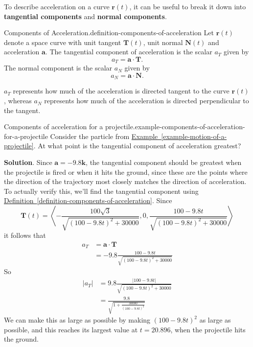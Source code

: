 \documentclass[10pt,]{book}
\newcommand{\terminology}[1]{\textbf{#1}}
\numberwithin{equation}{section}
\newcommand{\vv}[1]{\mathbf{#1}}
\newcommand{\dotprod}[1]{\left\langle #1 \right\rangle}
\begin{document}
\hypertarget{p-1317}{}%
To describe acceleration on a curve \(\vv{r}(t)\), it can be useful to break it down into \terminology{tangential components} and \terminology{normal components}.%
\begin{definition}{Components of Acceleration.}{definition-components-of-acceleration}%
\hypertarget{p-1318}{}%
Let \(\vv{r}(t)\) denote a space curve with unit tangent \(\vv{T}(t)\), unit normal \(\vv{N}(t)\) and acceleration \(\vv{a}\). The tangential component of acceleration is the scalar \(a_{T}\) given by%
%
\begin{equation*}
a_{T} = \vv{a}\cdot\vv{T}.
\end{equation*}
\hypertarget{p-1319}{}%
The normal component is the scalar \(a_{N}\) given by%
%
\begin{equation*}
a_{N} = \vv{a}\cdot\vv{N}.
\end{equation*}
\end{definition}
\hypertarget{p-1320}{}%
\(a_{T}\) represents how much of the acceleration is directed tangent to the curve \(\vv{r}(t)\), whereas \(a_{N}\) represents how much of the acceleration is directed perpendicular to the tangent.%
\begin{example}{Components of acceleration for a projectile.}{example-components-of-acceleration-for-a-projectile}%
\hypertarget{p-1321}{}%
Consider the particle from \hyperref[example-motion-of-a-projectile]{Example~\ref{example-motion-of-a-projectile}}. At what point is the tangential component of acceleration greatest?%
\par\smallskip%
\noindent\textbf{Solution}.\hypertarget{solution-210}{}\quad%
\hypertarget{p-1322}{}%
Since \(\vv{a} = -9.8\vv{k}\), the tangential component should be greatest when the projectile is fired or when it hits the ground, since these are the points where the direction of the trajectory most closely matches the direction of acceleration. To actually verify this, we'll find the tangential component using \hyperref[definition-components-of-acceleration]{Definition~\ref{definition-components-of-acceleration}}. Since%
%
\begin{equation*}
\vv{T}(t) = \dotprod{-\frac{100\sqrt{3}}{\sqrt{(100-9.8t)^{2}+30000}}, 0, \frac{100 - 9.8t}{\sqrt{(100-9.8t)^{2}+30000}}}
\end{equation*}
\hypertarget{p-1323}{}%
it follows that%
%
\begin{align*}
a_{T} & = \vv{a}\cdot\vv{T} \\
& =  -9.8\frac{100 - 9.8t}{\sqrt{(100-9.8t)^{2}+30000}}
\end{align*}
\hypertarget{p-1324}{}%
So%
%
\begin{align*}
|a_{T}| & = 9.8\frac{|100 - 9.8t|}{\sqrt{(100-9.8t)^{2}+30000}} \\
& = \frac{9.8}{\sqrt{1+\frac{30000}{(100-9.8t)^{2}}}} 
\end{align*}
\hypertarget{p-1325}{}%
We can make this as large as possible by making \((100-9.8t)^{2}\) as large as possible, and this reaches its largest value at \(t = 20.896\), when the projectile hits the ground.%
\end{example}
\end{document}

